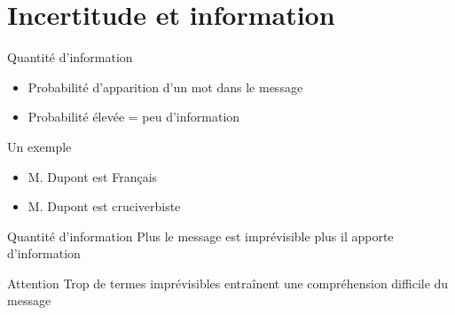 \section{Incertitude et information}

\begin{frame}
	\begin{block}{Quantité d'information}
		\begin{itemize}
			\item{Probabilité d'apparition d'un mot dans le message}
			\item{Probabilité élevée = peu d'information}
		\end{itemize}
	\end{block} \pause
	
	\begin{exampleblock}{Un exemple}
		\begin{itemize}
			\item{M. Dupont est Français} \pause
			\item{M. Dupont est cruciverbiste}
		\end{itemize}
	\end{exampleblock}
\end{frame}

\begin{frame}
	\begin{block}{Quantité d'information}
		Plus le message est imprévisible plus il apporte d'information
	\end{block} \pause
	
	\begin{alertblock}{Attention}
		Trop de termes imprévisibles entraînent une compréhension difficile du message
	\end{alertblock}
\end{frame}
